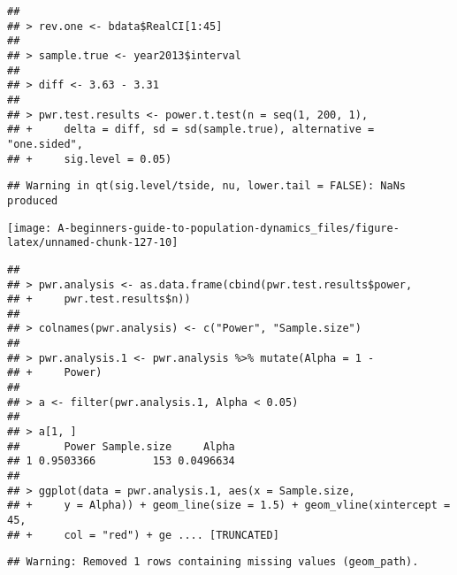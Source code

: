 \documentclass[]{book}
\begin{document}
\begin{verbatim}
## 
## > rev.one <- bdata$RealCI[1:45]
## 
## > sample.true <- year2013$interval
## 
## > diff <- 3.63 - 3.31
## 
## > pwr.test.results <- power.t.test(n = seq(1, 200, 1), 
## +     delta = diff, sd = sd(sample.true), alternative = "one.sided", 
## +     sig.level = 0.05)
\end{verbatim}

\begin{verbatim}
## Warning in qt(sig.level/tside, nu, lower.tail = FALSE): NaNs produced
\end{verbatim}

\begin{center}\texttt{[image: A-beginners-guide-to-population-dynamics\_files/figure-latex/unnamed-chunk-127-10]} \end{center}

\begin{verbatim}
## 
## > pwr.analysis <- as.data.frame(cbind(pwr.test.results$power, 
## +     pwr.test.results$n))
## 
## > colnames(pwr.analysis) <- c("Power", "Sample.size")
## 
## > pwr.analysis.1 <- pwr.analysis %>% mutate(Alpha = 1 - 
## +     Power)
## 
## > a <- filter(pwr.analysis.1, Alpha < 0.05)
## 
## > a[1, ]
##       Power Sample.size     Alpha
## 1 0.9503366         153 0.0496634
## 
## > ggplot(data = pwr.analysis.1, aes(x = Sample.size, 
## +     y = Alpha)) + geom_line(size = 1.5) + geom_vline(xintercept = 45, 
## +     col = "red") + ge .... [TRUNCATED]
\end{verbatim}

\begin{verbatim}
## Warning: Removed 1 rows containing missing values (geom_path).
\end{verbatim}
\end{document}
